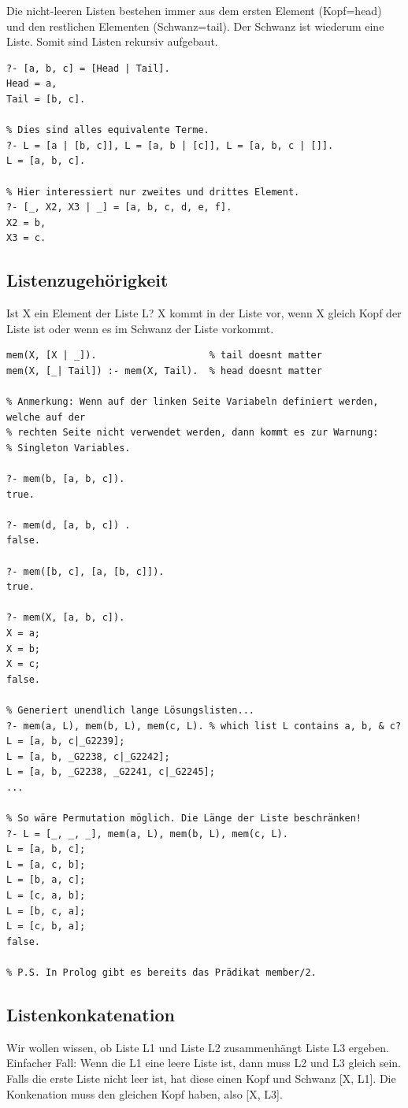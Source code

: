 Die nicht-leeren Listen bestehen immer aus dem ersten Element (Kopf=head) und den restlichen Elementen (Schwanz=tail). Der Schwanz ist wiederum eine Liste. Somit sind Listen rekursiv aufgebaut.

\begin{lstlisting}[caption=Tail-Operator auf Listen]
?- [a, b, c] = [Head | Tail].
Head = a,
Tail = [b, c].

% Dies sind alles equivalente Terme.
?- L = [a | [b, c]], L = [a, b | [c]], L = [a, b, c | []].
L = [a, b, c].

% Hier interessiert nur zweites und drittes Element.
?- [_, X2, X3 | _] = [a, b, c, d, e, f].
X2 = b,
X3 = c.
\end{lstlisting}

\newpage
\subsection{Listenzugehörigkeit}
Ist X ein Element der Liste L? X kommt in der Liste vor, wenn X gleich Kopf der Liste ist oder wenn es im Schwanz der Liste vorkommt. 

\begin{lstlisting}[caption=Listenzugehörigkeit]
mem(X, [X | _]). 					% tail doesnt matter
mem(X, [_| Tail]) :- mem(X, Tail). 	% head doesnt matter

% Anmerkung: Wenn auf der linken Seite Variabeln definiert werden, welche auf der
% rechten Seite nicht verwendet werden, dann kommt es zur Warnung: 
% Singleton Variables.

?- mem(b, [a, b, c]).
true.

?- mem(d, [a, b, c]) .
false.

?- mem([b, c], [a, [b, c]]).
true.

?- mem(X, [a, b, c]).
X = a;
X = b;
X = c;
false.

% Generiert unendlich lange Lösungslisten...
?- mem(a, L), mem(b, L), mem(c, L). % which list L contains a, b, & c?
L = [a, b, c|_G2239];
L = [a, b, _G2238, c|_G2242];
L = [a, b, _G2238, _G2241, c|_G2245];
...

% So wäre Permutation möglich. Die Länge der Liste beschränken!
?- L = [_, _, _], mem(a, L), mem(b, L), mem(c, L).
L = [a, b, c];
L = [a, c, b];
L = [b, a, c];
L = [c, a, b];
L = [b, c, a];
L = [c, b, a];
false.

% P.S. In Prolog gibt es bereits das Prädikat member/2.
\end{lstlisting}

\newpage
\subsection{Listenkonkatenation}
Wir wollen wissen, ob Liste L1 und Liste L2 zusammenhängt Liste L3 ergeben. Einfacher Fall: Wenn die L1 eine leere Liste ist, dann muss L2 und L3 gleich sein. Falls die erste Liste nicht leer ist, hat diese einen Kopf und Schwanz [X, L1]. Die Konkenation muss den gleichen Kopf haben, also [X, L3].

